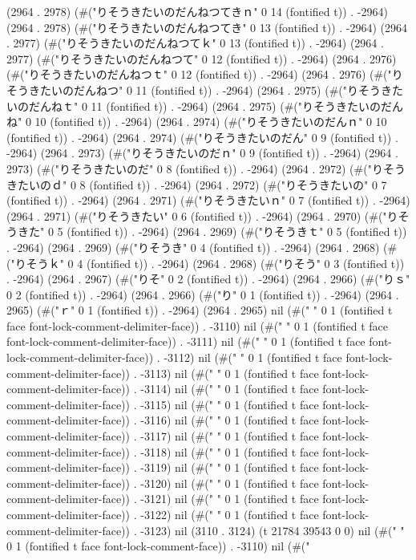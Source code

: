 {{(2964 . 2978) (#("りそうきたいのだんねつてきｎ" 0 14 (fontified t)) . -2964) (2964 . 2978) (#("りそうきたいのだんねつてき" 0 13 (fontified t)) . -2964) (2964 . 2977) (#("りそうきたいのだんねつてｋ" 0 13 (fontified t)) . -2964) (2964 . 2977) (#("りそうきたいのだんねつて" 0 12 (fontified t)) . -2964) (2964 . 2976) (#("りそうきたいのだんねつｔ" 0 12 (fontified t)) . -2964) (2964 . 2976) (#("りそうきたいのだんねつ" 0 11 (fontified t)) . -2964) (2964 . 2975) (#("りそうきたいのだんねｔ" 0 11 (fontified t)) . -2964) (2964 . 2975) (#("りそうきたいのだんね" 0 10 (fontified t)) . -2964) (2964 . 2974) (#("りそうきたいのだんｎ" 0 10 (fontified t)) . -2964) (2964 . 2974) (#("りそうきたいのだん" 0 9 (fontified t)) . -2964) (2964 . 2973) (#("りそうきたいのだｎ" 0 9 (fontified t)) . -2964) (2964 . 2973) (#("りそうきたいのだ" 0 8 (fontified t)) . -2964) (2964 . 2972) (#("りそうきたいのｄ" 0 8 (fontified t)) . -2964) (2964 . 2972) (#("りそうきたいの" 0 7 (fontified t)) . -2964) (2964 . 2971) (#("りそうきたいｎ" 0 7 (fontified t)) . -2964) (2964 . 2971) (#("りそうきたい" 0 6 (fontified t)) . -2964) (2964 . 2970) (#("りそうきた" 0 5 (fontified t)) . -2964) (2964 . 2969) (#("りそうきｔ" 0 5 (fontified t)) . -2964) (2964 . 2969) (#("りそうき" 0 4 (fontified t)) . -2964) (2964 . 2968) (#("りそうｋ" 0 4 (fontified t)) . -2964) (2964 . 2968) (#("りそう" 0 3 (fontified t)) . -2964) (2964 . 2967) (#("りそ" 0 2 (fontified t)) . -2964) (2964 . 2966) (#("りｓ" 0 2 (fontified t)) . -2964) (2964 . 2966) (#("り" 0 1 (fontified t)) . -2964) (2964 . 2965) (#("ｒ" 0 1 (fontified t)) . -2964) (2964 . 2965) nil (#(" " 0 1 (fontified t face font-lock-comment-delimiter-face)) . -3110) nil (#(" " 0 1 (fontified t face font-lock-comment-delimiter-face)) . -3111) nil (#(" " 0 1 (fontified t face font-lock-comment-delimiter-face)) . -3112) nil (#(" " 0 1 (fontified t face font-lock-comment-delimiter-face)) . -3113) nil (#(" " 0 1 (fontified t face font-lock-comment-delimiter-face)) . -3114) nil (#(" " 0 1 (fontified t face font-lock-comment-delimiter-face)) . -3115) nil (#(" " 0 1 (fontified t face font-lock-comment-delimiter-face)) . -3116) nil (#(" " 0 1 (fontified t face font-lock-comment-delimiter-face)) . -3117) nil (#(" " 0 1 (fontified t face font-lock-comment-delimiter-face)) . -3118) nil (#(" " 0 1 (fontified t face font-lock-comment-delimiter-face)) . -3119) nil (#(" " 0 1 (fontified t face font-lock-comment-delimiter-face)) . -3120) nil (#(" " 0 1 (fontified t face font-lock-comment-delimiter-face)) . -3121) nil (#(" " 0 1 (fontified t face font-lock-comment-delimiter-face)) . -3122) nil (#(" " 0 1 (fontified t face font-lock-comment-delimiter-face)) . -3123) nil (3110 . 3124) (t 21784 39543 0 0) nil (#("
" 0 1 (fontified t face font-lock-comment-face)) . -3110) nil (#("

}}
